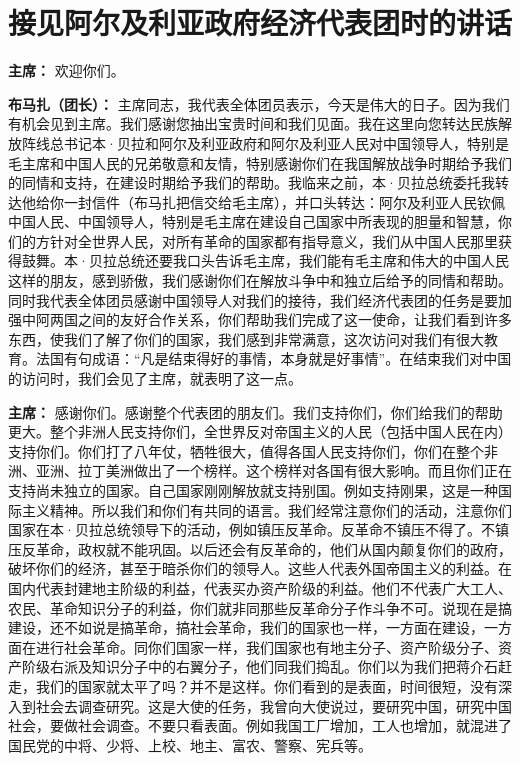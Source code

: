 \section[接见阿尔及利亚政府经济代表团时的讲话（一九六四年九月二十日）]{接见阿尔及利亚政府经济代表团时的讲话}

\begin{duihua}

\item[\textbf{主席：}] 欢迎你们。

\item[\textbf{布马扎（团长）：}] 主席同志，我代表全体团员表示，今天是伟大的日子。因为我们有机会见到主席。我们感谢您抽出宝贵时间和我们见面。我在这里向您转达民族解放阵线总书记本·贝拉和阿尔及利亚政府和阿尔及利亚人民对中国领导人，特别是毛主席和中国人民的兄弟敬意和友情，特别感谢你们在我国解放战争时期给予我们的同情和支持，在建设时期给予我们的帮助。我临来之前，本·贝拉总统委托我转达他给你一封信件（布马扎把信交给毛主席），并口头转达：阿尔及利亚人民钦佩中国人民、中国领导人，特别是毛主席在建设自己国家中所表现的胆量和智慧，你们的方针对全世界人民，对所有革命的国家都有指导意义，我们从中国人民那里获得鼓舞。本·贝拉总统还要我口头告诉毛主席，我们能有毛主席和伟大的中国人民这样的朋友，感到骄傲，我们感谢你们在解放斗争中和独立后给予的同情和帮助。同时我代表全体团员感谢中国领导人对我们的接待，我们经济代表团的任务是要加强中阿两国之间的友好合作关系，你们帮助我们完成了这一使命，让我们看到许多东西，使我们了解了你们的国家，我们感到非常满意，这次访问对我们有很大教育。法国有句成语：“凡是结束得好的事情，本身就是好事情”。在结束我们对中国的访问时，我们会见了主席，就表明了这一点。

\item[\textbf{主席：}] 感谢你们。感谢整个代表团的朋友们。我们支持你们，你们给我们的帮助更大。整个非洲人民支持你们，全世界反对帝国主义的人民（包括中国人民在内）支持你们。你们打了八年仗，牺牲很大，值得各国人民支持你们，你们在整个非洲、亚洲、拉丁美洲做出了一个榜样。这个榜样对各国有很大影响。而且你们正在支持尚未独立的国家。自己国家刚刚解放就支持别国。例如支持刚果，这是一种国际主义精神。所以我们和你们有共同的语言。我们经常注意你们的活动，注意你们国家在本·贝拉总统领导下的活动，例如镇压反革命。反革命不镇压不得了。不镇压反革命，政权就不能巩固。以后还会有反革命的，他们从国内颠复你们的政府，破坏你们的经济，甚至于暗杀你们的领导人。这些人代表外国帝国主义的利益。在国内代表封建地主阶级的利益，代表买办资产阶级的利益。他们不代表广大工人、农民、革命知识分子的利益，你们就非同那些反革命分子作斗争不可。说现在是搞建设，还不如说是搞革命，搞社会革命，我们的国家也一样，一方面在建设，一方面在进行社会革命。同你们国家一样，我们国家也有地主分子、资产阶级分子、资产阶级右派及知识分子中的右翼分子，他们同我们捣乱。你们以为我们把蒋介石赶走，我们的国家就太平了吗？并不是这样。你们看到的是表面，时间很短，没有深入到社会去调查研究。这是大使的任务，我曾向大使说过，要研究中国，研究中国社会，要做社会调查。不要只看表面。例如我国工厂增加，工人也增加，就混进了国民党的中将、少将、上校、地主、富农、警察、宪兵等。


\end{duihua}
